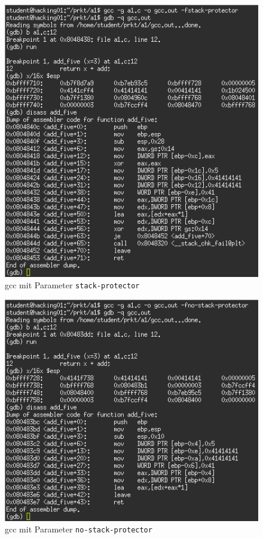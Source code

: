 \documentclass[11pt,a4paper]{article}
\begin{document}
\begin{figure}[h!]
  \caption{gcc mit Parameter \texttt{stack-protector}}
  \label{gcc0}
  \centering
    \includegraphics[scale=1]{1_gcc_protector_0.png}
\end{figure}
\begin{figure}[h!]
  \caption{gcc mit Parameter \texttt{no-stack-protector}}
  \label{gcc1}
  \centering
    \includegraphics[scale=1]{1_gcc_protector_1.png}
\end{figure}
\end{document}
